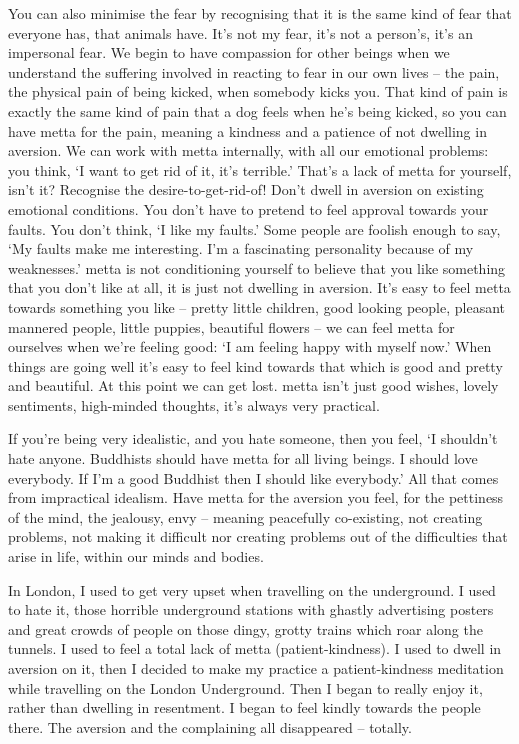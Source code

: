 You can also minimise the fear by recognising that it is the same kind of fear that everyone has, that animals have. It's not my fear, it's not a person's, it's an impersonal fear. We begin to have compassion for other beings when we understand the suffering involved in reacting to fear in our own lives -- the pain, the physical pain of being kicked, when somebody kicks you. That kind of pain is exactly the same kind of pain that a dog feels when he's being kicked, so you can have metta for the pain, meaning a kindness and a patience of not dwelling in aversion. We can work with metta internally, with all our emotional problems: you think, `I want to get rid of it, it's terrible.' That's a lack of metta for yourself, isn't it? Recognise the desire-to-get-rid-of! Don't dwell in aversion on existing emotional conditions. You don't have to pretend to feel approval towards your faults. You don't think, `I like my faults.' Some people are foolish enough to say, `My faults make me interesting. I'm a fascinating personality because of my weaknesses.' metta is not conditioning yourself to believe that you like something that you don't like at all, it is just not dwelling in aversion. It's easy to feel metta towards something you like -- pretty little children, good looking people, pleasant mannered people, little puppies, beautiful flowers -- we can feel metta for ourselves when we're feeling good: `I am feeling happy with myself now.' When things are going well it's easy to feel kind towards that which is good and pretty and beautiful. At this point we can get lost. metta isn't just good wishes, lovely sentiments, high-minded thoughts, it's always very practical.

If you're being very idealistic, and you hate someone, then you feel, `I shouldn't hate anyone. Buddhists should have metta for all living beings. I should love everybody. If I'm a good Buddhist then I should like everybody.' All that comes from impractical idealism. Have metta for the aversion you feel, for the pettiness of the mind, the jealousy, envy -- meaning peacefully co-existing, not creating problems, not making it difficult nor creating problems out of the difficulties that arise in life, within our minds and bodies.

In London, I used to get very upset when travelling on the underground. I used to hate it, those horrible underground stations with ghastly advertising posters and great crowds of people on those dingy, grotty trains which roar along the tunnels. I used to feel a total lack of metta (patient-kindness). I used to dwell in aversion on it, then I decided to make my practice a patient-kindness meditation while travelling on the London Underground. Then I began to really enjoy it, rather than dwelling in resentment. I began to feel kindly towards the people there. The aversion and the complaining all disappeared -- totally.

